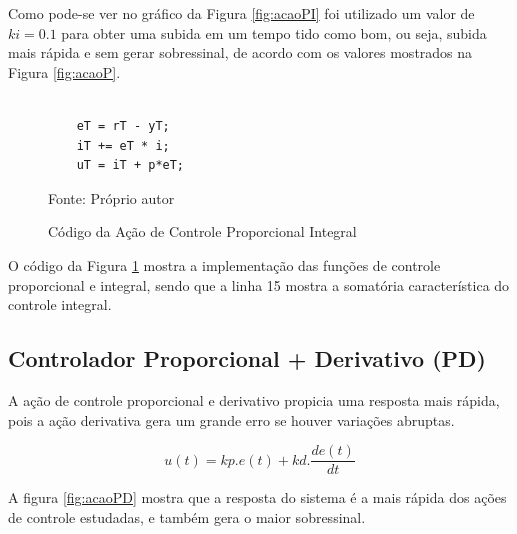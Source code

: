 Como pode-se ver no gráfico da Figura \ref{fig:acaoPI} foi utilizado um valor de $ki = 0.1$ para obter uma subida em um tempo tido como bom, ou seja, subida mais rápida e sem gerar sobressinal, de acordo com os valores mostrados na Figura \ref{fig:acaoP}.

\begin{figure}[!htb]
\centering
\caption{Código da Ação de Controle Proporcional Integral}
\begin{minipage}{0.8\linewidth}
\lstset{firstnumber=13}
\begin{lstlisting}

    eT = rT - yT;
    iT += eT * i; 
    uT = iT + p*eT;
\end{lstlisting}
\end{minipage}
\label{fig:codigoControladorPI}

{\small Fonte: Próprio autor}
\end{figure}

O código da Figura \ref{fig:codigoControladorPI} mostra a implementação das funções de controle proporcional e integral, sendo que a linha 15 mostra a somatória característica do controle integral.










\subsection{ Controlador Proporcional + Derivativo (PD) }

A ação de controle proporcional e derivativo propicia uma resposta mais rápida, pois a ação derivativa gera um grande erro se houver variações abruptas.

\begin{equation}
u(t) = kp.e(t) + kd. \frac{d e(t)}{dt}
\end{equation}

A figura \ref{fig:acaoPD} mostra que a resposta do sistema é a mais rápida dos ações de controle estudadas, e também gera o maior sobressinal. 


